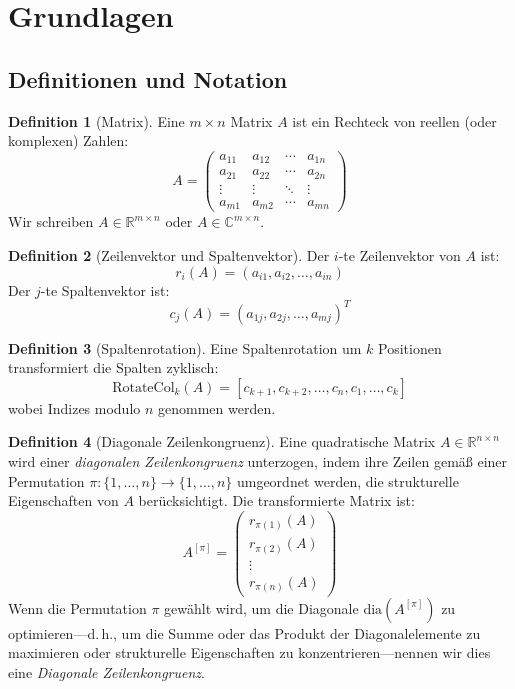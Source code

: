 \documentclass[a4paper,12pt]{article}
\theoremstyle{definition}
\newtheorem{definition}{Definition}
\begin{document}
\section{Grundlagen}

\subsection{Definitionen und Notation}

\begin{definition}[Matrix]
	Eine $m \times n$ Matrix $A$ ist ein Rechteck von reellen (oder komplexen) Zahlen:
	\[
	A = \begin{pmatrix}
		a_{11} & a_{12} & \cdots & a_{1n} \\
		a_{21} & a_{22} & \cdots & a_{2n} \\
		\vdots & \vdots & \ddots & \vdots \\
		a_{m1} & a_{m2} & \cdots & a_{mn}
	\end{pmatrix}
	\]
	Wir schreiben $A \in \mathbb{R}^{m \times n}$ oder $A \in \mathbb{C}^{m \times n}$.
\end{definition}

\begin{definition}[Zeilenvektor und Spaltenvektor]
	Der $i$-te Zeilenvektor von $A$ ist:
	\[
	r_i(A) = (a_{i1}, a_{i2}, \ldots, a_{in})
	\]
	Der $j$-te Spaltenvektor ist:
	\[
	c_j(A) = (a_{1j}, a_{2j}, \ldots, a_{mj})^T
	\]
\end{definition}

\begin{definition}[Spaltenrotation]
	Eine Spaltenrotation um $k$ Positionen transformiert die Spalten zyklisch:
	\[
	\text{RotateCol}_k(A) = [c_{k+1}, c_{k+2}, \ldots, c_n, c_1, \ldots, c_k]
	\]
	wobei Indizes modulo $n$ genommen werden.
\end{definition}

\begin{definition}[Diagonale Zeilenkongruenz]
	\label{def:diag-kongruenz}
	Eine quadratische Matrix $A \in \mathbb{R}^{n \times n}$ wird einer \emph{diagonalen Zeilenkongruenz} unterzogen, indem ihre Zeilen gemäß einer Permutation $\pi: \{1,\ldots,n\} \to \{1,\ldots,n\}$ umgeordnet werden, die strukturelle Eigenschaften von $A$ berücksichtigt. Die transformierte Matrix ist:
	\[
	A^{[\pi]} = \begin{pmatrix}
		r_{\pi(1)}(A) \\
		r_{\pi(2)}(A) \\
		\vdots \\
		r_{\pi(n)}(A)
	\end{pmatrix}
	\]
	Wenn die Permutation $\pi$ gewählt wird, um die Diagonale $\text{dia}(A^{[\pi]})$ zu optimieren—d.\,h., um die Summe oder das Produkt der Diagonalelemente zu maximieren oder strukturelle Eigenschaften zu konzentrieren—nennen wir dies eine \emph{Diagonale Zeilenkongruenz}.
\end{definition}
\end{document}

